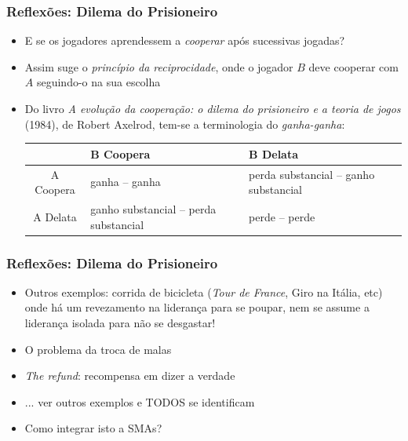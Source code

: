 \begin{frame}
\frametitle{Reflexões: Dilema do Prisioneiro}

\begin{itemize}
  \item E se os jogadores aprendessem a \textit{cooperar} após sucessivas jogadas?

  \item Assim suge o \textit{princípio da reciprocidade}, onde o jogador $B$ 
  deve cooperar com $A$ seguindo-o na sua escolha

\pause 
  \item Do livro \textit{A evolução da cooperação: o dilema do prisioneiro e a teoria de jogos} (1984),  de Robert Axelrod, tem-se a terminologia do \textit{ganha-ganha}: 
    
  \begin{center}
    \begin{tabular}{c||p{3cm}|p{3cm}}
    \hline \hline
                & B Coopera & B Delata  \\     \hline \hline
     A Coopera  &   ganha -- ganha     & perda substancial -- ganho substancial  \\     \hline 
     A Delata   &    	ganho substancial -- perda substancial &  	perde -- perde   \\
         \hline \hline

    \end{tabular}
  \end{center}

\end{itemize}

\end{frame}

\begin{frame}
\frametitle{Reflexões: Dilema do Prisioneiro}

\begin{itemize}
\item Outros exemplos: corrida de bicicleta (\textit{Tour de France}, Giro na Itália, etc)  onde há um revezamento na liderança para se poupar, nem se assume a liderança isolada para não se desgastar!

\item O problema da troca de malas

\item \textit{The refund}: recompensa em dizer a verdade 

\item ... ver outros exemplos e TODOS se identificam

\item Como integrar isto a SMAs?
\end{itemize}

\end{frame}

